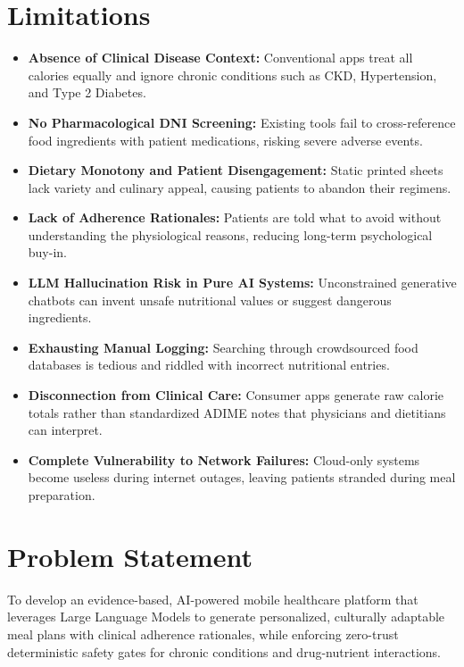 \documentclass[a4paper,12pt]{report}
\begin{document}
\section{Limitations}
\begin{itemize}
\item \textbf{Absence of Clinical Disease Context:} Conventional apps treat all calories equally and ignore chronic conditions such as CKD, Hypertension, and Type 2 Diabetes.

\item \textbf{No Pharmacological DNI Screening:} Existing tools fail to cross-reference food ingredients with patient medications, risking severe adverse events.

\item \textbf{Dietary Monotony and Patient Disengagement:} Static printed sheets lack variety and culinary appeal, causing patients to abandon their regimens.

\item \textbf{Lack of Adherence Rationales:} Patients are told what to avoid without understanding the physiological reasons, reducing long-term psychological buy-in.

\item \textbf{LLM Hallucination Risk in Pure AI Systems:} Unconstrained generative chatbots can invent unsafe nutritional values or suggest dangerous ingredients.

\item \textbf{Exhausting Manual Logging:} Searching through crowdsourced food databases is tedious and riddled with incorrect nutritional entries.

\item \textbf{Disconnection from Clinical Care:} Consumer apps generate raw calorie totals rather than standardized ADIME notes that physicians and dietitians can interpret.

\item \textbf{Complete Vulnerability to Network Failures:} Cloud-only systems become useless during internet outages, leaving patients stranded during meal preparation.
\end{itemize}

\section{Problem Statement}
\par To develop an evidence-based, AI-powered mobile healthcare platform that leverages Large Language Models to generate personalized, culturally adaptable meal plans with clinical adherence rationales, while enforcing zero-trust deterministic safety gates for chronic conditions and drug-nutrient interactions.
\end{document}

